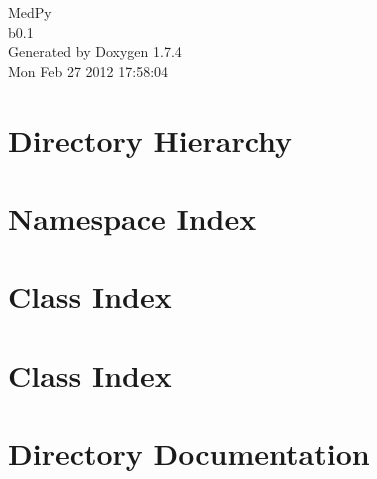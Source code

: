 \documentclass[a4paper]{book}
\begin{document}
\hypersetup{pageanchor=false}
\begin{titlepage}
\vspace*{7cm}
\begin{center}
{\Large MedPy \\[1ex]\large b0.1 }\\
\vspace*{1cm}
{\large Generated by Doxygen 1.7.4}\\
\vspace*{0.5cm}
{\small Mon Feb 27 2012 17:58:04}\\
\end{center}
\end{titlepage}
\clearemptydoublepage
{}
\tableofcontents
\clearemptydoublepage
{}
\hypersetup{pageanchor=true}
\chapter{Directory Hierarchy}

\chapter{Namespace Index}

\chapter{Class Index}

\chapter{Class Index}

\chapter{Directory Documentation}



















\end{document}
